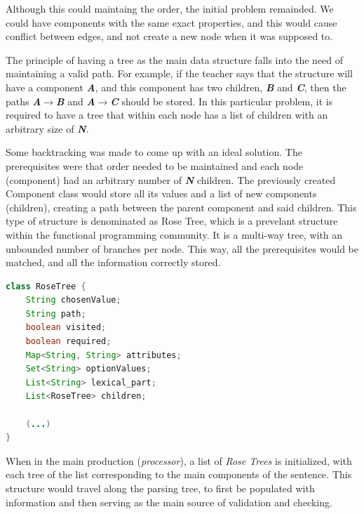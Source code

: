 Although this could maintaing the order, the initial problem remainded. We could have components with the same exact properties, and this would cause conflict between
edges, and not create a new node when it was supposed to.

The principle of having a tree as the main data structure falls into the need of maintaining a valid path. For example, if the teacher says that the structure will have a component \emph{\textbf{A}}, and this component has two children, \emph{\textbf{B}} and \emph{\textbf{C}}, then the paths \emph{\textbf{A$\rightarrow$B}} and \emph{\textbf{A$\rightarrow$C}} should be stored. In this particular problem, it is required to have a tree that within each node has a list of children with an arbitrary size of \emph{\textbf{N}}.

Some backtracking was made to come up with an ideal solution. The prerequisites were that order needed to be maintained and each node (component) had an arbitrary number
of \emph{\textbf{N}} children. The previously created Component class would store all its values and a list of new components (children), creating a path between 
the parent component and said children. This type of structure is denominated as Rose Tree, which is a prevelant structure within the functional programming community. 
It is a multi-way tree, with an unbounded number of branches per node. This way, all the prerequisites would be matched, and all the information correctly stored. 

\begin{center}
\begin{minipage}{10cm}
\begin{lstlisting}[language=java, basicstyle=\small, label={lst:rosetree_class}, caption=RoseTree class]
class RoseTree {
    String chosenValue;
    String path;
    boolean visited;
    boolean required;
    Map<String, String> attributes;
    Set<String> optionValues;
    List<String> lexical_part;
    List<RoseTree> children;

    (...)
}
\end{lstlisting}
\end{minipage}
\end{center}

When in the main production (\emph{processor}), a list of \emph{Rose Trees} is initialized, with each tree of the list corresponding to the main components of the sentence. This structure would travel along the parsing tree, to first be populated with information and then serving as the main source of validation and checking.

